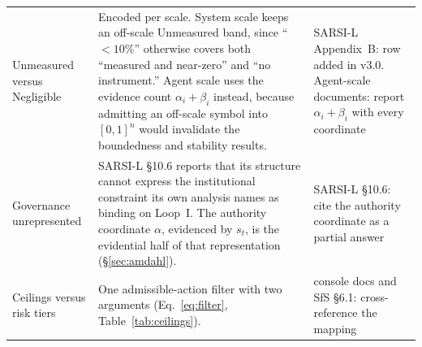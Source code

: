 \documentclass[11pt]{article}
\begin{document}
\begin{longtable}{p{2.6cm} p{5.6cm} p{6.4cm}}
Unmeasured versus Negligible & Encoded per scale. System scale keeps an off-scale \textsf{Unmeasured} band, since ``$<10\%$'' otherwise covers both ``measured and near-zero'' and ``no instrument.'' Agent scale uses the evidence count $\alpha_i+\beta_i$ instead, because admitting an off-scale symbol into $[0,1]^n$ would invalidate the boundedness and stability results. & SARSI-L Appendix~B: row added in v3.0. Agent-scale documents: report $\alpha_i+\beta_i$ with every coordinate \\
Governance unrepresented & SARSI-L \S10.6 reports that its structure cannot express the institutional constraint its own analysis names as binding on Loop~I. The authority coordinate $\alpha$, evidenced by $s_t$, is the evidential half of that representation (\S\ref{sec:amdahl}). & SARSI-L \S10.6: cite the authority coordinate as a partial answer \\
Ceilings versus risk tiers & One admissible-action filter with two arguments (Eq.~\ref{eq:filter}, Table~\ref{tab:ceilings}). & console docs and SfS \S6.1: cross-reference the mapping \\
\end{longtable}



\end{document}
